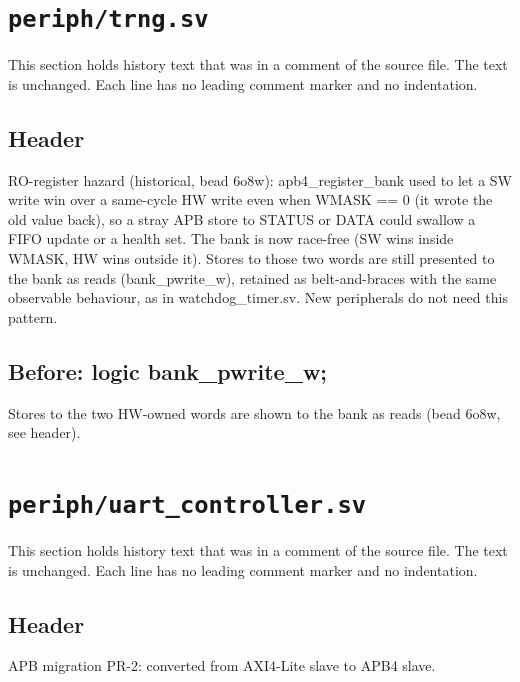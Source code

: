 \section{\texttt{periph/trng.sv}}\label{cr:mod:trng}

This section holds history text that was in a comment of the source file. The text is unchanged. Each line has no leading comment marker and no indentation.

\begin{record}

\subsection*{Header}

\begin{textblock}
RO-register hazard (historical, bead 6o8w): apb4_register_bank used to let a SW write win over a
same-cycle HW write even when WMASK == 0 (it wrote the old value back), so a stray APB store to
STATUS or DATA could swallow a FIFO update or a health set. The bank is now race-free (SW wins
inside WMASK, HW wins outside it). Stores to those two words are still presented to the bank as
reads (bank_pwrite_w), retained as belt-and-braces with the same observable behaviour, as in
watchdog_timer.sv. New peripherals do not need this pattern.
\end{textblock}

\subsection*{Before: logic bank\_pwrite\_w;}

\begin{textblock}
Stores to the two HW-owned words are shown to the bank as reads (bead 6o8w, see header).
\end{textblock}

\end{record}

\section{\texttt{periph/uart\_controller.sv}}\label{cr:mod:uart-controller}

This section holds history text that was in a comment of the source file. The text is unchanged. Each line has no leading comment marker and no indentation.

\begin{record}

\subsection*{Header}

\begin{textblock}
APB migration PR-2: converted from AXI4-Lite slave to APB4 slave.
\end{textblock}

\end{record}

